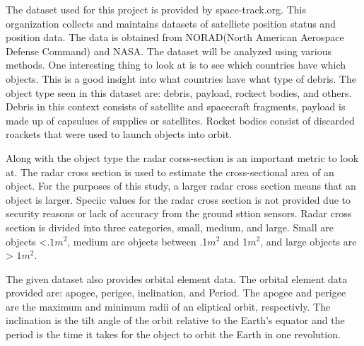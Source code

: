 \documentclass[12pt,a4paper]{article}
\begin{document}
The dataset used for this project is provided by space-track.org. This organization collects and maintains datasets of satelliete position status and position data. The data is obtained from NORAD(North American Aerospace Defense Command) and NASA. The dataset will be analyzed using various methods. One interesting thing to look at is to see which countries have which objects. This is a good insight into what countries have what type of debris. The object type seen in this dataset are: debris, payload, rockect bodies, and others. Debris in this context consists of satellite and spacecraft fragments, payload is made up of capsulues of supplies or satellites. Rocket bodies consist of discarded roackets that were used to launch objects into orbit. 

Along with the object type the radar corss-section is an important metric to look at. The radar cross section is used to estimate the cross-sectional area of an object. For the purposes of this study, a larger radar cross section means that an object is larger. Speciic values for the radar cross section is not provided due to security reasons or lack of accuracy from the ground sttion sensors. Radar cross section is divided into three categories, small, medium, and large. Small are objects <$.1 m^2$, medium are objects between .1$m^2$ and 1$m^2$, and large objects are > $1m^2$.

The given dataset also provides orbital element data. The orbital element data provided are: apogee, perigee, inclination, and Period. The apogee and perigee are the maximum and minimum radii of an eliptical orbit, respectivly. The inclination is the tilt angle of the orbit relative to the Earth's equator and the period is the time it takes for the object to orbit the Earth in one revolution. 
\end{document}
